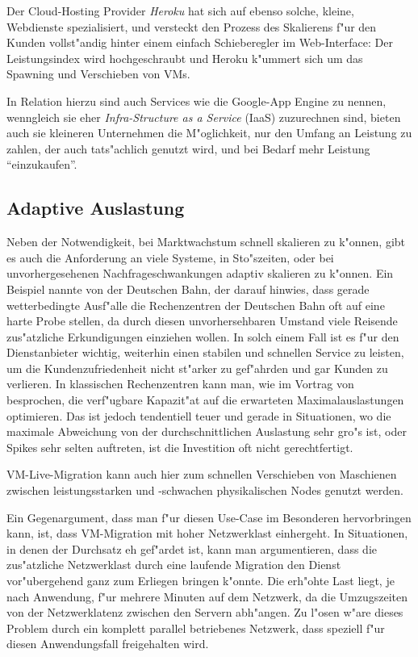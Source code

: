 \documentclass[draft,journal]{IEEEtran}
\begin{document}
Der Cloud-Hosting Provider \emph{Heroku} hat sich auf ebenso solche,
kleine, Webdienste spezialisiert, und versteckt den Prozess des
Skalierens f"ur den Kunden vollst"andig hinter einem einfach
Schieberegler im Web-Interface: Der Leistungsindex wird hochgeschraubt
und Heroku k"ummert sich um das Spawning und Verschieben von VMs.

In Relation hierzu sind auch Services wie die Google-App Engine zu
nennen, wenngleich sie eher \emph{Infra-Structure as a Service}
(IaaS) zuzurechnen sind, bieten auch sie kleineren Unternehmen die
M"oglichkeit, nur den Umfang an Leistung zu zahlen, der auch
tats"achlich genutzt wird, und bei Bedarf mehr Leistung
"`einzukaufen"'.

\subsection{Adaptive Auslastung}
\label{sec:adaptive-auslastung}
Neben der Notwendigkeit, bei Marktwachstum schnell skalieren zu
k"onnen, gibt es auch die Anforderung an viele Systeme, in
Sto"szeiten, oder bei unvorhergesehenen Nachfrageschwankungen adaptiv
skalieren zu k"onnen. Ein Beispiel nannte \cite{none} von der
Deutschen Bahn, der darauf hinwies, dass gerade wetterbedingte
Ausf"alle die Rechenzentren der Deutschen Bahn oft auf eine harte
Probe stellen, da durch diesen unvorhersehbaren Umstand viele Reisende
zus"atzliche Erkundigungen einziehen wollen. In solch einem Fall ist
es f"ur den Dienstanbieter wichtig, weiterhin einen stabilen und
schnellen Service zu leisten, um die Kundenzufriedenheit nicht
st"arker zu gef"ahrden und gar Kunden zu verlieren. In klassischen
Rechenzentren kann man, wie im Vortrag von \cite{benchmarkingthecloud}
besprochen, die verf"ugbare Kapazit"at auf die erwarteten
Maximalauslastungen optimieren. Das ist jedoch tendentiell teuer und
gerade in Situationen, wo die maximale Abweichung von der
durchschnittlichen Auslastung sehr gro"s ist, oder Spikes sehr selten
auftreten, ist die Investition oft nicht gerechtfertigt.

VM-Live-Migration kann auch hier zum schnellen Verschieben von
Maschienen zwischen leistungsstarken und -schwachen physikalischen
Nodes genutzt werden.

Ein Gegenargument, dass man f"ur diesen Use-Case im Besonderen
hervorbringen kann, ist, dass VM-Migration mit hoher Netzwerklast
einhergeht. In Situationen, in denen der Durchsatz eh gef"ardet ist,
kann man argumentieren, dass die zus"atzliche Netzwerklast durch eine
laufende Migration den Dienst vor"ubergehend ganz zum Erliegen bringen
k"onnte. Die erh"ohte Last liegt, je nach Anwendung, f"ur mehrere
Minuten auf dem Netzwerk, da die Umzugszeiten von der Netzwerklatenz
zwischen den Servern abh"angen. Zu l"osen w"are dieses Problem durch
ein komplett parallel betriebenes Netzwerk, dass speziell f"ur diesen
Anwendungsfall freigehalten wird.
\end{document}
